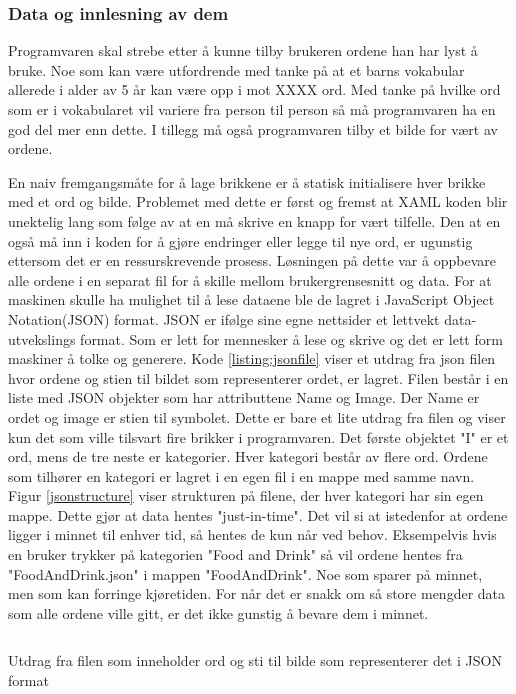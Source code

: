 {\subsubsection{Data og innlesning av dem}

Programvaren skal strebe etter å kunne tilby brukeren ordene han har lyst å bruke. Noe som kan være utfordrende med tanke på at et barns vokabular allerede i alder av 5 år kan være opp i mot XXXX ord. Med tanke på hvilke ord som er i vokabularet vil variere  fra person til person så må programvaren ha en god del mer enn dette. I tillegg må også programvaren tilby et bilde for vært av ordene. 

En naiv fremgangsmåte for å lage brikkene er å statisk initialisere hver brikke med et ord og bilde. Problemet med dette er først og fremst at XAML koden blir unektelig lang som følge av at en må skrive en knapp for vært tilfelle. Den at en også må inn i koden for å gjøre endringer eller legge til nye ord, er ugunstig ettersom det er en ressurskrevende prosess. Løsningen på dette var å oppbevare alle ordene i en separat fil for å skille mellom brukergrensesnitt og data. For at maskinen skulle ha mulighet til å lese dataene ble de lagret i JavaScript Object Notation(JSON) format. JSON er ifølge sine egne nettsider \cite{JSON7:online} et lettvekt data-utvekslings format. Som er lett for mennesker å lese og skrive og det er lett form maskiner å tolke og generere. Kode \ref{listing:jsonfile} viser et utdrag fra json filen hvor ordene og stien til bildet som representerer ordet, er lagret. Filen består i en liste med JSON objekter som har attributtene Name og Image. Der Name er ordet og image er stien til symbolet. Dette er bare et lite utdrag fra filen og viser kun det som ville tilsvart fire brikker i programvaren. Det første objektet "I" er et ord, mens de tre neste er kategorier. Hver kategori består av flere ord. Ordene som tilhører en kategori er lagret i en egen fil i en mappe med samme navn. Figur \ref{jsonstructure} viser strukturen på filene, der hver kategori har sin egen mappe. Dette gjør at data hentes "just-in-time". Det vil si at istedenfor at ordene ligger i minnet til enhver tid, så hentes de kun når ved behov. Eksempelvis hvis en bruker trykker på kategorien "Food and Drink" så vil ordene hentes fra "FoodAndDrink.json" i mappen "FoodAndDrink". Noe som sparer på minnet, men som kan forringe kjøretiden. For når det er snakk om så store mengder data som alle ordene ville gitt, er det ikke gunstig å bevare dem i minnet. 


\begin{listing}[ht] 
\inputminted[fontsize=\footnotesize, frame=lines,framesep=2mm,baselinestretch=1.2,bgcolor=lightgray,linenos]{json}{Code/JSONfile.json} 
\caption{Utdrag fra filen som inneholder ord og sti til bilde som representerer det i JSON format} 
\label{listing:jsonfile} 
\end{listing} 
 
}
